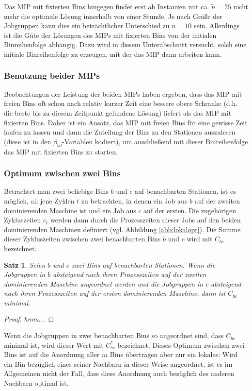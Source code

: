 \documentclass{scrreprt}
\newtheorem{satz}{Satz}
\begin{document}
Das MIP mit fixierten Bins hingegen findet erst ab Instanzen mit ca. $\tilde{n}=25$ nicht mehr die optimale Lösung innerhalb von einer Stunde.
Je nach Größe der Jobgruppen kann dies ein beträchtlicher Unterschied zu $\tilde{n}=10$ sein. 
Allerdings ist die Güte der Lösungen des MIPs mit fixierten Bins von der initialen Binreihenfolge abhängig.
Dazu wird in diesem Unterabschnitt versucht, solch eine initiale Binreihenfolge zu erzeugen, mit der das MIP dann arbeiten kann.

\subsubsection{Benutzung beider MIPs}
Beobachtungen der Leistung der beiden MIPs haben ergeben, dass das MIP mit freien Bins oft schon nach relativ kurzer Zeit eine bessere obere Schranke
(d.h. die beste bis zu diesem Zeitpunkt gefundene Lösung) liefert als das MIP mit fixierten Bins.
Daher ist ein Ansatz, das MIP mit freien Bins für eine gewisse Zeit laufen zu lassen und dann die Zuteilung der Bins zu den Stationen
auszulesen (diese ist in den $\beta_{bd}$-Variablen kodiert), um anschließend mit dieser Binreihenfolge das MIP mit fixierten Bins zu starten.


\subsubsection{Optimum zwischen zwei Bins}
Betrachtet man zwei beliebige Bins $b$ und $c$ auf benachbarten Stationen, ist es möglich, 
all jene Zyklen $t$ zu betrachten, in denen ein Job aus $b$ auf der zweiten dominierenden Maschine ist und ein Job aus $c$ auf der ersten.
Die zugehörigen Zykluszeiten $c_t$ werden dann durch die Prozesszeiten dieser Jobs auf den beiden dominierenden Maschinen definiert (vgl. Abbildung \ref{abb:lokalopt}).
Die Summe dieser Zykluszeiten zwischen zwei benachbarten Bins $b$ und $c$ wird mit $C_{bc}$ bezeichnet.
\begin{satz}
    Seien $b$ und $c$ zwei Bins auf benachbarten Stationen.
    Wenn die Jobgruppen in $b$ absteigend nach ihren Prozesszeiten auf der zweiten dominierenden Maschine angeordnet werden
    und die Jobgruppen in $c$ absteigend nach ihren Prozesszeiten auf der ersten dominierenden Maschine,
    dann ist $C_{bc}$ minimal.
\end{satz}
\begin{proof}
    \textit{hmm...}
\end{proof}
Wenn die Jobgruppen in zwei benachbarten Bins so angeordnet sind, dass $C_{bc}$ minimal ist, wird dieser Wert mit $C_{bc}^*$ bezeichnet.
Dieses Optimum zwischen zwei Bins ist auf die Anordnung aller $m$ Bins übertragen aber nur ein lokales:
Wird ein Bin bezüglich eines seiner Nachbarn in dieser Weise angeordnet, ist es im Allgemeinen nicht der Fall,
dass diese Anordnung auch bezüglich des anderen Nachbarn optimal ist.
\end{document}
